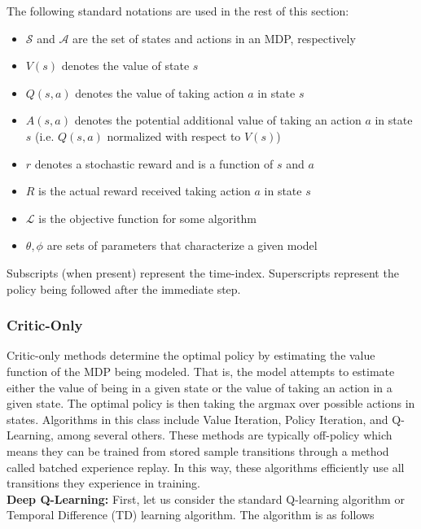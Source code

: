 \documentclass[12pt]{article}
\begin{document}
The following standard notations are used in the rest of this section:

\begin{itemize}
  \item $\mathcal{S}$ and $\mathcal{A}$ are the set of states and actions in an MDP, respectively
  \item $V(s)$ denotes the value of state $s$
  \item $Q(s,a)$ denotes the value of taking action $a$ in state $s$
  \item $A(s,a)$ denotes the potential additional value of taking an action $a$ in state $s$ (i.e. $Q(s,a)$ normalized with respect to $V(s)$)
  \item $r$ denotes a stochastic reward and is a function of $s$ and $a$
  \item $R$ is the actual reward received taking action $a$ in state $s$
  \item $\mathcal{L}$ is the objective function for some algorithm
  \item $\theta, \phi$ are sets of parameters that characterize a given model
\end{itemize}

Subscripts (when present) represent the time-index. Superscripts represent the policy being followed after the immediate step.

\subsubsection{Critic-Only}

Critic-only methods determine the optimal policy by estimating the value function of the MDP being modeled. That is, the model attempts to estimate either the value of being in a given state or the value of taking an action in a given state. The optimal policy is then taking the argmax over possible actions in states. Algorithms in this class include Value Iteration, Policy Iteration, and Q-Learning, among several others. These methods are typically off-policy which means they can be trained from stored sample transitions through a method called batched experience replay. In this way, these algorithms efficiently use all transitions they experience in training. \\

\textbf{Deep Q-Learning:} First, let us consider the standard Q-learning algorithm or Temporal Difference (TD) learning algorithm. The algorithm is as follows

\medskip
\end{document}
